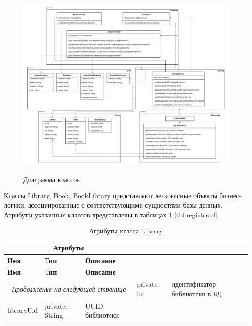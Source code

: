 \documentclass[a4paper, 12pt]{article}
\begin{document}
\begin{large}
\begin{figure}[h!]
	\begin{center}
		{\includegraphics[scale = 0.5]{UML_Class}}
		\caption{Диаграмма классов}
		\label{fig:diag-classes}
	\end{center}
\end{figure}


Классы Library, Book, BookLibrary представляют легковесные объекты бизнес-логики, ассоциированные с соответствующими сущностями базы данных. 
Атрибуты указанных классов представлены в таблицах \ref{tbl:club}-\ref{tbl:registered}.

\begin{longtable}{| p{3cm} | p{5cm} | p{8cm} |}
	\caption{Атрибуты класса Library}
	\label{tbl:club} \\
	\hline
	
	\multicolumn{3}{|c|}{\textbf{Атрибуты}} \\
	\hline
	
	\textbf{Имя} & \textbf{Тип} & \textbf{Описание} \\
	\hline
	\endfirsthead
	
	\hline
	\textbf{Имя} & \textbf{Тип} & \textbf{Описание} \\
	\hline
	\endhead
	
	\hline
	\multicolumn{3}{c}{\textit{Продолжение на следующей странице}}
	\endfoot
	\hline
	\endlastfoot
	
	id
	&
	private: int
	&
	идентификатор библиотеки в БД\\
	\hline
	
	libraryUid
	&
	private: String
	&
	UUID библиотеки \\
	\hline
	

\end{longtable}
\end{large}
\end{document}
